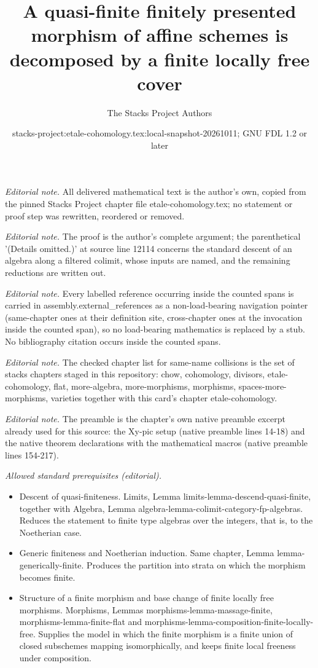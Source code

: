 \documentclass[10pt,a4paper]{amsart}
\title{A quasi-finite finitely presented morphism of affine schemes is decomposed by a finite locally free cover}
\author{The Stacks Project Authors}
\date{stacks-project:etale-cohomology.tex:local-snapshot-20261011; GNU FDL 1.2 or later}
\theoremstyle{plain}
\theoremstyle{definition}
\theoremstyle{remark}
\numberwithin{equation}{subsection}
\begin{document}
\maketitle
\noindent\textit{Editorial note.} All delivered mathematical text is the author's own, copied from the pinned Stacks Project chapter file etale-cohomology.tex; no statement or proof step was rewritten, reordered or removed.\par\medskip
\noindent\textit{Editorial note.} The proof is the author's complete argument; the parenthetical '(Details omitted.)' at source line 12114 concerns the standard descent of an algebra along a filtered colimit, whose inputs are named, and the remaining reductions are written out.\par\medskip
\noindent\textit{Editorial note.} Every labelled reference occurring inside the counted spans is carried in assembly.external\_references as a non-load-bearing navigation pointer (same-chapter ones at their definition site, cross-chapter ones at the invocation inside the counted span), so no load-bearing mathematics is replaced by a stub. No bibliography citation occurs inside the counted spans.\par\medskip
\noindent\textit{Editorial note.} The checked chapter list for same-name collisions is the set of stacks chapters staged in this repository: chow, cohomology, divisors, etale-cohomology, flat, more-algebra, more-morphisms, morphisms, spaces-more-morphisms, varieties together with this card's chapter etale-cohomology.\par\medskip
\noindent\textit{Editorial note.} The preamble is the chapter's own native preamble excerpt already used for this source: the Xy-pic setup (native preamble lines 14-18) and the native theorem declarations with the mathematical macros (native preamble lines 154-217).\par\medskip
\noindent\textit{Allowed standard prerequisites (editorial).}\begin{itemize}
\item Descent of quasi-finiteness. Limits, Lemma limits-lemma-descend-quasi-finite, together with Algebra, Lemma algebra-lemma-colimit-category-fp-algebras. Reduces the statement to finite type algebras over the integers, that is, to the Noetherian case.
\item Generic finiteness and Noetherian induction. Same chapter, Lemma lemma-generically-finite. Produces the partition into strata on which the morphism becomes finite.
\item Structure of a finite morphism and base change of finite locally free morphisms. Morphisms, Lemmas morphisms-lemma-massage-finite, morphisms-lemma-finite-flat and morphisms-lemma-composition-finite-locally-free. Supplies the model in which the finite morphism is a finite union of closed subschemes mapping isomorphically, and keeps finite local freeness under composition.
\end{itemize}\medskip
\end{document}
